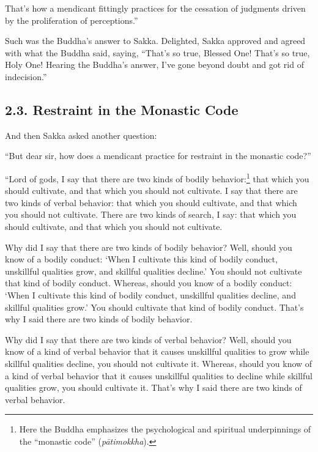 \documentclass[12pt,openany]{book}%
\begin{document}
That’s how a mendicant fittingly practices for the cessation of judgments driven by the proliferation of perceptions.” 

Such was the Buddha’s answer to Sakka. Delighted, Sakka approved and agreed with what the Buddha said, saying, “That’s so true, Blessed One! That’s so true, Holy One! Hearing the Buddha’s answer, I’ve gone beyond doubt and got rid of indecision.” 

\subsection*{2.3. Restraint in the Monastic Code }

And then Sakka asked another question: 

“But dear sir, how does a mendicant practice for restraint in the monastic code?” 

“Lord of gods, I say that there are two kinds of bodily behavior:\footnote{Here the Buddha emphasizes the psychological and spiritual underpinnings of the “monastic code” (\textit{\textsanskrit{pātimokkha}}). } that which you should cultivate, and that which you should not cultivate. I say that there are two kinds of verbal behavior: that which you should cultivate, and that which you should not cultivate. There are two kinds of search, I say: that which you should cultivate, and that which you should not cultivate. 

Why did I say that there are two kinds of bodily behavior? Well, should you know of a bodily conduct: ‘When I cultivate this kind of bodily conduct, unskillful qualities grow, and skillful qualities decline.’ You should not cultivate that kind of bodily conduct. Whereas, should you know of a bodily conduct: ‘When I cultivate this kind of bodily conduct, unskillful qualities decline, and skillful qualities grow.’ You should cultivate that kind of bodily conduct. That’s why I said there are two kinds of bodily behavior. 

Why did I say that there are two kinds of verbal behavior? Well, should you know of a kind of verbal behavior that it causes unskillful qualities to grow while skillful qualities decline, you should not cultivate it. Whereas, should you know of a kind of verbal behavior that it causes unskillful qualities to decline while skillful qualities grow, you should cultivate it. That’s why I said there are two kinds of verbal behavior. 
\end{document}
